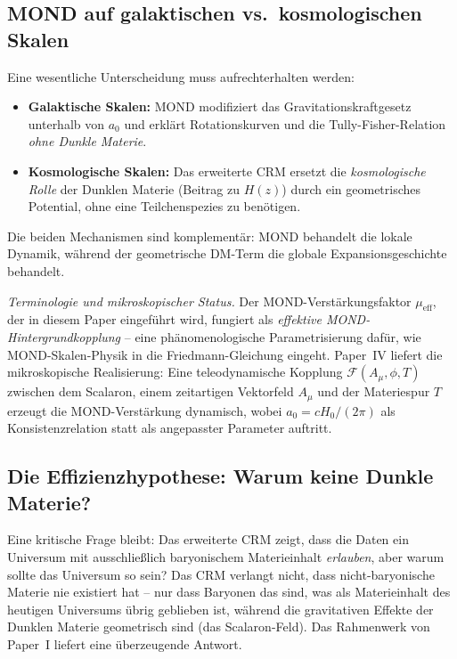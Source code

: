 \documentclass[aps,prd,twocolumn,superscriptaddress,nofootinbib,floatfix]{revtex4-2}
\begin{document}
\subsection{MOND auf galaktischen vs.\ kosmologischen Skalen}

Eine wesentliche Unterscheidung muss aufrechterhalten werden:
\begin{itemize}
\item \textbf{Galaktische Skalen:} MOND modifiziert das Gravitationskraftgesetz unterhalb von $a_0$ und erklärt Rotationskurven und die Tully-Fisher-Relation \textit{ohne Dunkle Materie}.
\item \textbf{Kosmologische Skalen:} Das erweiterte CRM ersetzt die \textit{kosmologische Rolle} der Dunklen Materie (Beitrag zu $H(z)$) durch ein geometrisches Potential, ohne eine Teilchenspezies zu benötigen.
\end{itemize}

Die beiden Mechanismen sind komplementär: MOND behandelt die lokale Dynamik, während der geometrische DM-Term die globale Expansionsgeschichte behandelt.

\textit{Terminologie und mikroskopischer Status.} Der MOND-Verstärkungsfaktor $\mu_{\mathrm{eff}}$, der in diesem Paper eingeführt wird, fungiert als \emph{effektive MOND-Hintergrundkopplung} -- eine phänomenologische Parametrisierung dafür, wie MOND-Skalen-Physik in die Friedmann-Gleichung eingeht. Paper~IV \cite{Geiger2026d} liefert die mikroskopische Realisierung: Eine teleodynamische Kopplung $\mathcal{F}(A_\mu, \phi, T)$ zwischen dem Scalaron, einem zeitartigen Vektorfeld $A_\mu$ und der Materiespur $T$ erzeugt die MOND-Verstärkung dynamisch, wobei $a_0 = cH_0/(2\pi)$ als Konsistenzrelation statt als angepasster Parameter auftritt.

\subsection{Die Effizienzhypothese: Warum keine Dunkle Materie?}
\label{subsec:efficiency}

Eine kritische Frage bleibt: Das erweiterte CRM zeigt, dass die Daten ein Universum mit ausschließlich baryonischem Materieinhalt \textit{erlauben}, aber warum sollte das Universum so sein? Das CRM verlangt nicht, dass nicht-baryonische Materie nie existiert hat -- nur dass Baryonen das sind, was als Materieinhalt des heutigen Universums übrig geblieben ist, während die gravitativen Effekte der Dunklen Materie geometrisch sind (das Scalaron-Feld). Das Rahmenwerk von Paper~I liefert eine überzeugende Antwort.
\end{document}
